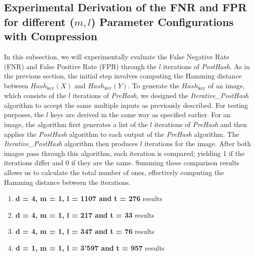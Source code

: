 \subsection{Experimental Derivation of the FNR and FPR for different (\(m, l\)) Parameter Configurations with Compression}
In this subsection, we will experimentally evaluate the False Negative Rate (FNR) and False Positive Rate (FPR) through the \(l\) iterations of \textit{PostHash}. As in the previous section, the initial step involves computing the Hamming distance between \(Hash_{\text{key}}(X)\) and \(Hash_{\text{key}}(Y)\). To generate the \(Hash_{\text{key}}\) of an image, which consists of the \(l\) iterations of \textit{PreHash}, we designed the \textit{Iterative\_PostHash} algorithm to accept the same multiple inputs as previously described. For testing purposes, the \(l\) keys are derived in the same way as specified earlier. For an image, the algorithm first generates a list of the \(l\) iterations of \textit{PreHash} and then applies the \textit{PostHash} algorithm to each output of the \textit{PreHash} algorithm. The \textit{Iterative\_PostHash} algorithm then produces \(l\) iterations for the image. After both images pass through this algorithm, each iteration is compared; yielding 1 if the iterations differ and 0 if they are the same. Summing these comparison results allows us to calculate the total number of ones, effectively computing the Hamming distance between the iterations.

\begin{enumerate}
    \item \textbf{d = 4, m = 1, l = 1107 and t = 276}
    results
    \item \textbf{d = 4, m = 1, l = 217 and t = 33}
    results
    \item \textbf{d = 4, m = 1, l = 347 and t = 76}
    results
    \item \textbf{d = 1, m = 1, l = 3'597 and t = 957}
    results
\end{enumerate}
